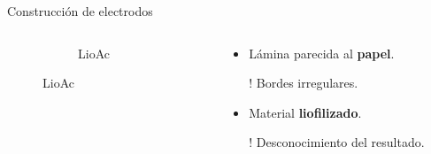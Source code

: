 \documentclass[aspectratio=169]{beamer}
\newcommand{\mLiofilizadoAcero}{LioAc }
\begin{document}
\begin{frame}{Construcción de electrodos}
\begin{columns}
\begin{column}{0.3\textwidth}
\begin{figure}
{\begin{subfigure}[b]{\electrodesWidth}
						\caption{\mLiofilizadoAcero}
					\end{subfigure}}
				\end{figure}
			\end{column}
			\begin{column}{0.6\textwidth}
				\begin{itemize}[<+->]
					\item Lámina parecida al \textbf{papel}.
					\item[!] Bordes irregulares.
					\item Material \textbf{liofilizado}.
					\item[!] Desconocimiento del resultado.
				\end{itemize}
			\end{column}
		\end{columns}		
	\end{frame}
\end{document}
